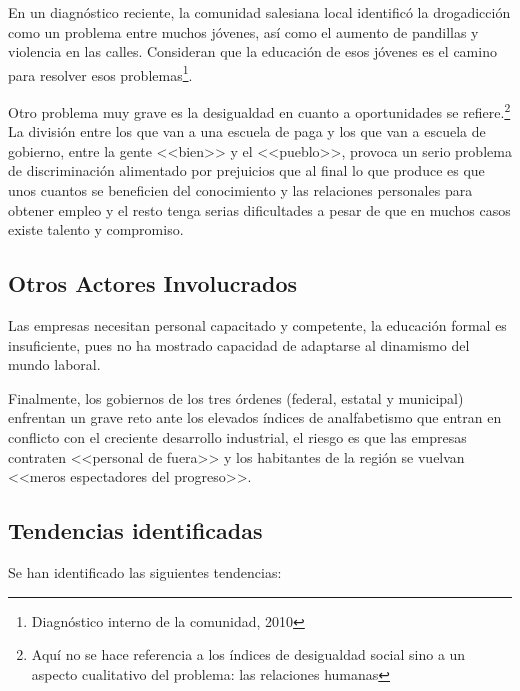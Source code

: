 En un diagnóstico reciente, la comunidad salesiana local identificó la drogadicción como un problema entre muchos jóvenes, así como el aumento de pandillas y violencia en las calles. Consideran que la educación de esos jóvenes es el camino para resolver esos problemas\footnote{Diagnóstico interno de la comunidad, 2010}.

Otro problema muy grave es la desigualdad en cuanto a oportunidades se refiere.\footnote{Aquí no se hace referencia a los índices de desigualdad social sino a un aspecto cualitativo del problema: las relaciones humanas} La división entre los que van a una escuela de paga y los que van a escuela de gobierno, entre la gente <<bien>> y el <<pueblo>>, provoca un serio problema de discriminación alimentado por prejuicios que al final lo que produce es que unos cuantos se beneficien del conocimiento y las relaciones personales para obtener empleo y el resto tenga serias dificultades a pesar de que en muchos casos existe talento y compromiso.

\subsection{Otros Actores Involucrados}

Las empresas necesitan personal capacitado y competente, la educación formal es insuficiente, pues no ha mostrado capacidad de adaptarse al dinamismo del mundo laboral.

Finalmente, los gobiernos de los tres órdenes (federal, estatal y municipal) enfrentan un grave reto ante los elevados índices de analfabetismo que entran en conflicto con el creciente desarrollo industrial, el riesgo es que las empresas contraten <<personal de fuera>> y los habitantes de la región se vuelvan <<meros espectadores del progreso>>.

\subsection{Tendencias identificadas}

Se han identificado las siguientes tendencias:

